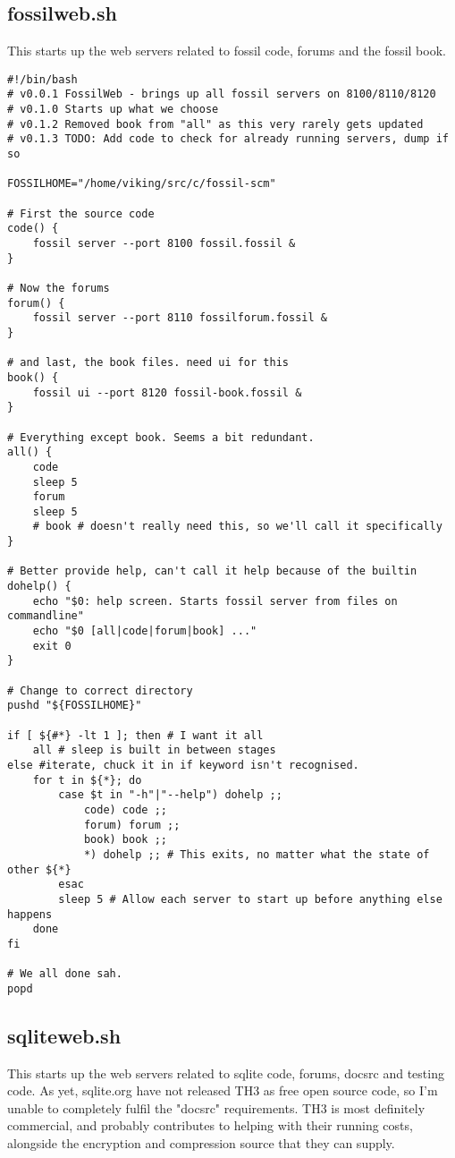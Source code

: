 \documentclass[11pt]{article}
\begin{document}
\subsection*{fossilweb.sh}
\label{sec:org1cfe59b}
This starts up the web servers related to fossil code, forums and the fossil book.
\begin{verbatim}
#!/bin/bash
# v0.0.1 FossilWeb - brings up all fossil servers on 8100/8110/8120
# v0.1.0 Starts up what we choose
# v0.1.2 Removed book from "all" as this very rarely gets updated
# v0.1.3 TODO: Add code to check for already running servers, dump if so

FOSSILHOME="/home/viking/src/c/fossil-scm"

# First the source code
code() {
    fossil server --port 8100 fossil.fossil &
}

# Now the forums
forum() {
    fossil server --port 8110 fossilforum.fossil &
}

# and last, the book files. need ui for this
book() {
    fossil ui --port 8120 fossil-book.fossil &
}

# Everything except book. Seems a bit redundant.
all() {
	code
	sleep 5
	forum
	sleep 5
	# book # doesn't really need this, so we'll call it specifically
}

# Better provide help, can't call it help because of the builtin
dohelp() {
	echo "$0: help screen. Starts fossil server from files on commandline"
	echo "$0 [all|code|forum|book] ..."
	exit 0
}

# Change to correct directory
pushd "${FOSSILHOME}"

if [ ${#*} -lt 1 ]; then # I want it all
	all # sleep is built in between stages
else #iterate, chuck it in if keyword isn't recognised.
	for t in ${*}; do
		case $t in "-h"|"--help") dohelp ;;
			code) code ;;
			forum) forum ;;
			book) book ;;
			*) dohelp ;; # This exits, no matter what the state of other ${*}
		esac
		sleep 5 # Allow each server to start up before anything else happens
	done
fi

# We all done sah.
popd

\end{verbatim}

\subsection*{sqliteweb.sh}
\label{sec:org50c8fb9}
This starts up the web servers related to sqlite code, forums, docsrc and testing code. As yet,
sqlite.org have not released TH3 as free open source code, so I'm unable to completely fulfil
the "docsrc" requirements. TH3 is most definitely commercial, and probably contributes to helping
with their running costs, alongside the encryption and compression source that they can supply.
\end{document}
